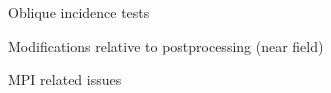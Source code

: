 \documentclass[smaller,xcolor=table,dvipsnames]{beamer}
\newcommand{\dirinputtex}{./inputtex}
\begin{document}

  \begin{frame}[plain,label=TestOblicuo]
    \centering    \Large{Oblique incidence tests}
  \end{frame}






  \begin{frame}[plain]
    \centering \Large{Modifications relative to postprocessing (near
      field)}
    
  \end{frame}
  
  
  

  \begin{frame}[plain,label=MPI]
    \centering    \Large{MPI related issues}
  \end{frame}


  


  
\end{document}
